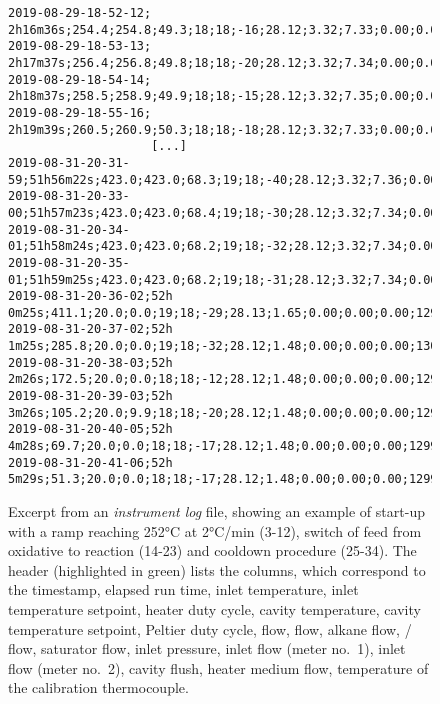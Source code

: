 \documentclass[12pt]{article}
\begin{document}
\begin{landscape}
\begin{figure}[tbh]
\begin{lstlisting}[escapechar=£,
    linewidth=24cm]
2019-08-29-18-52-12; 2h16m36s;254.4;254.8;49.3;18;18;-16;28.12;3.32;7.33;0.00;0.00;1300.6;0.656;0.98;15;8;20.8
2019-08-29-18-53-13; 2h17m37s;256.4;256.8;49.8;18;18;-20;28.12;3.32;7.34;0.00;0.00;1300.6;0.656;1.00;15;8;20.1
2019-08-29-18-54-14; 2h18m37s;258.5;258.9;49.9;18;18;-15;28.12;3.32;7.35;0.00;0.00;1300.0;0.656;0.99;15;8;19.9
2019-08-29-18-55-16; 2h19m39s;260.5;260.9;50.3;18;18;-18;28.12;3.32;7.33;0.00;0.00;1300.6;0.656;1.00;15;8;19.8
                    [...]
2019-08-31-20-31-59;51h56m22s;423.0;423.0;68.3;19;18;-40;28.12;3.32;7.36;0.00;0.00;1299.7;0.656;0.00;15;8;21.5
2019-08-31-20-33-00;51h57m23s;423.0;423.0;68.4;19;18;-30;28.12;3.32;7.34;0.00;0.00;1300.0;0.657;0.00;15;8;21.5
2019-08-31-20-34-01;51h58m24s;423.0;423.0;68.2;19;18;-32;28.12;3.32;7.34;0.00;0.00;1300.3;0.656;0.00;15;8;21.6
2019-08-31-20-35-01;51h59m25s;423.0;423.0;68.2;19;18;-31;28.12;3.32;7.34;0.00;0.00;1299.4;0.656;0.00;15;8;20.9
2019-08-31-20-36-02;52h 0m25s;411.1;20.0;0.0;19;18;-29;28.13;1.65;0.00;0.00;0.00;1294.4;1.260;24.43;15;8;21.2
2019-08-31-20-37-02;52h 1m25s;285.8;20.0;0.0;19;18;-32;28.12;1.48;0.00;0.00;0.00;1300.0;1.211;0.99;15;8;21.1
2019-08-31-20-38-03;52h 2m26s;172.5;20.0;0.0;18;18;-12;28.12;1.48;0.00;0.00;0.00;1299.7;1.210;0.99;15;8;21.3
2019-08-31-20-39-03;52h 3m26s;105.2;20.0;9.9;18;18;-20;28.12;1.48;0.00;0.00;0.00;1299.7;1.211;0.99;15;8;21.6
2019-08-31-20-40-05;52h 4m28s;69.7;20.0;0.0;18;18;-17;28.12;1.48;0.00;0.00;0.00;1299.7;1.211;1.00;15;8;21.8
2019-08-31-20-41-06;52h 5m29s;51.3;20.0;0.0;18;18;-17;28.12;1.48;0.00;0.00;0.00;1299.7;1.211;1.00;15;8;20.9
\end{lstlisting}
\centering
\caption{Excerpt from an \emph{instrument log} file, showing an example of start-up with a ramp reaching 252°C at 2°C/min (3-12), switch of feed from oxidative to reaction (14-23) and cooldown procedure (25-34). The header (highlighted in green) lists the columns, which correspond to the timestamp, elapsed run time, inlet temperature, inlet temperature setpoint, heater duty cycle, cavity temperature, cavity temperature setpoint, Peltier duty cycle,  flow,  flow, alkane flow, / flow, saturator flow, inlet pressure, inlet flow (meter no.~1), inlet flow (meter no.~2), cavity flush, heater medium flow, temperature of the calibration thermocouple. \label{fig:instlog}}
\end{figure}
\end{landscape}
\clearpage
\end{document}
